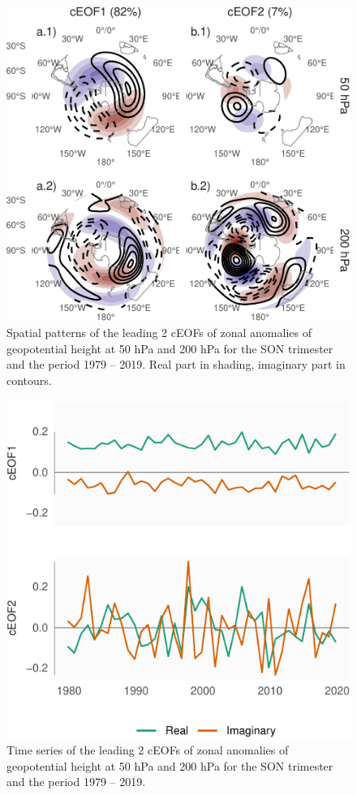 \documentclass[smallextended]{svjour3}       %
\begin{document}
\begin{figure}
\centering
\includegraphics{../figures/ceofs-1-1.pdf}
\caption{\label{fig:ceofs-1}Spatial patterns of the leading 2 cEOFs of zonal anomalies of geopotential height at 50 hPa and 200 hPa for the SON trimester and the period 1979 -- 2019. Real part in shading, imaginary part in contours.}
\end{figure}

\begin{figure}
\centering
\includegraphics{../figures/ceofs-2-1.pdf}
\caption{\label{fig:ceofs-2}Time series of the leading 2 cEOFs of zonal anomalies of geopotential height at 50 hPa and 200 hPa for the SON trimester and the period 1979 -- 2019.}
\end{figure}
\end{document}
